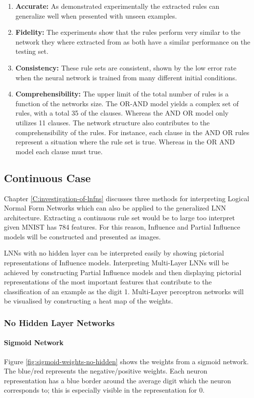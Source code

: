 \begin{enumerate}
	\item \textbf{Accurate:} As demonstrated experimentally the extracted rules can generalize well when presented with unseen examples.
	\item \textbf{Fidelity:} The experiments show that the rules perform very similar to the network they where extracted from as both have a similar performance on the testing set.
	\item \textbf{Consistency:} These rule sets are consistent, shown by the low error rate when the neural network is trained from many different initial conditions.
	\item \textbf{Comprehensibility:} The upper limit of the total number of rules is a function of the networks size. The OR-AND model yields a complex set of rules, with a total 35 of the clauses. Whereas the AND OR model only utilizes 11 clauses. The network structure also contributes to the comprehensibility of the rules. For instance, each clause in the AND OR rules represent a situation where the rule set is true. Whereas in the OR AND model each clause must true.
\end{enumerate}

\subsection{Continuous Case}
Chapter \ref{C:investigation-of-lnfns} discusses three methods for interpreting Logical Normal Form Networks which can also be applied to the generalized LNN architecture. Extracting a continuous rule set would be to large too interpret given MNIST has 784 features. For this reason, Influence and Partial Influence models will be constructed and presented as images.

LNNs with no hidden layer can be interpreted easily by showing pictorial representations of Influence models. Interpreting Multi-Layer LNNs will be achieved by constructing Partial Influence models and then displaying pictorial representations of the most important features that contribute to the classification of an example as the digit 1. Multi-Layer perceptron networks will be visualised by constructing a heat map of the weights.

\subsubsection{No Hidden Layer Networks}

\paragraph{Sigmoid Network}
Figure \ref{fig:sigmoid-weights-no-hidden} shows the weights from a sigmoid network. The blue/red represents the negative/positive weights. Each neuron representation has a blue border around the average digit which the neuron corresponds to; this is especially visible in the representation for 0.


